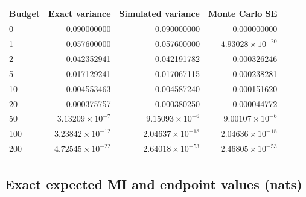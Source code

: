 \begingroup\small
\setlength{\tabcolsep}{4pt}
\begin{longtable}{lrrr}
\toprule

Budget & Exact variance & Simulated variance & Monte Carlo SE\\\midrule\endhead

0 & 0.090000000 & 0.090000000 & 0.000000000\\

1 & 0.057600000 & 0.057600000 & $4.93028\times10^{-20}$\\

2 & 0.042352941 & 0.042191782 & 0.000326246\\

5 & 0.017129241 & 0.017067115 & 0.000238281\\

10 & 0.004553463 & 0.004587240 & 0.000151620\\

20 & 0.000375757 & 0.000380250 & 0.000044772\\

50 & $3.13209\times10^{-7}$ & $9.15093\times10^{-6}$ & $9.00107\times10^{-6}$\\

100 & $3.23842\times10^{-12}$ & $2.04637\times10^{-18}$ & $2.04636\times10^{-18}$\\

200 & $4.72545\times10^{-22}$ & $2.64018\times10^{-53}$ & $2.46805\times10^{-53}$\\

\bottomrule
\end{longtable}
\endgroup

\reservetable
\subsection{Exact expected MI and endpoint values (nats)}

